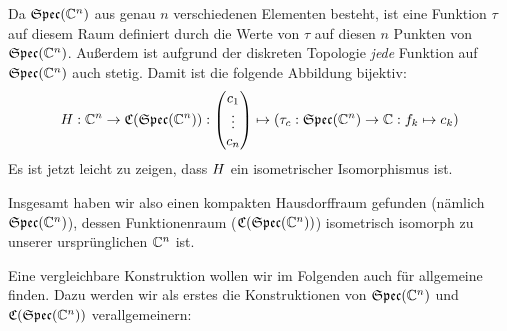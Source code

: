 Da $\mathfrak{Spec}(\mathbb{C}^n)$ aus genau $n$ verschiedenen Elementen besteht, ist eine Funktion $\tau$ auf diesem Raum definiert durch die Werte von $\tau$ auf diesen $n$ Punkten von $\mathfrak{Spec}(\mathbb{C}^n)$. Außerdem ist aufgrund der diskreten Topologie \emph{jede} Funktion auf $\mathfrak{Spec}(\mathbb{C}^n)$ auch stetig. Damit ist die folgende Abbildung bijektiv:
	\[H: \mathbb{C}^n  \to \mathfrak{C}(\mathfrak{Spec}(\mathbb{C}^n)): \left(\begin{matrix} c_1 \\ \vdots \\ c_n \end{matrix}\right) \mapsto (\tau_c: \mathfrak{Spec}(\mathbb{C}^n) \to \mathbb{C}: f_k \mapsto c_k) \]
Es ist jetzt leicht zu zeigen, dass $H$ ein isometrischer Isomorphismus ist.

Insgesamt haben wir also einen kompakten Hausdorffraum gefunden (nämlich $\mathfrak{Spec}(\mathbb{C}^n)$), dessen Funktionenraum ($\mathfrak{C}(\mathfrak{Spec}(\mathbb{C}^n))$) isometrisch isomorph zu unserer ursprünglichen \CAlg{} $\mathbb{C}^n$ ist.

Eine vergleichbare Konstruktion wollen wir im Folgenden auch für allgemeine \CAlgn{} finden. Dazu werden wir als erstes die Konstruktionen von $\mathfrak{Spec}(\mathbb{C}^n)$ und $\mathfrak{C}(\mathfrak{Spec}(\mathbb{C}^n))$ verallgemeinern: